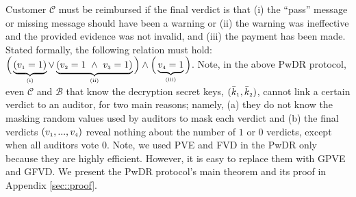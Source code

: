 Customer $\mathcal{C}$ must be reimbursed if the final verdict is that (i)  the ``pass'' message or  missing message should have been a warning or (ii)  the warning was ineffective and the provided evidence was not invalid, and (iii) the payment has been made. Stated formally, the following relation must hold: $\Big( \underbrace{(v_{\scriptscriptstyle 1}=1)}_{\scriptscriptstyle (\text{i})}\vee  \underbrace{(v_{\scriptscriptstyle 2}=1\ \wedge\ v_{\scriptscriptstyle 3}=1)}_{\scriptscriptstyle (\text {ii})}\Big)\wedge\Big(\underbrace{v_{\scriptscriptstyle 4}=1}_{\scriptscriptstyle (\text{iii})}\Big)$.
%
%
%
%
%
Note, in the above PwDR protocol, even $\mathcal{C}$ and $\mathcal{B}$ that know the decryption secret keys, $(\bar k_{\scriptscriptstyle 1}, \bar k_{\scriptscriptstyle 2})$, cannot link a certain verdict to an auditor, for two main reasons; namely,  (a) they do not know the masking random values used by auditors to mask each verdict and (b) the final verdicts $(v_{\scriptscriptstyle 1},..., v_{\scriptscriptstyle 4})$ reveal nothing about the number of $1$ or $0$ verdicts, except when all auditors vote $0$.  Note, we used PVE and FVD in the PwDR  only because they are highly efficient. However, it is easy to replace them with GPVE and GFVD. We present the PwDR protocol's  main theorem and its proof in Appendix \ref{sec::proof}.  





